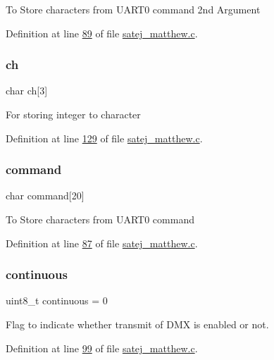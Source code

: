 To Store characters from U\+A\+R\+T0 command 2nd Argument 

Definition at line \mbox{\hyperlink{satej__matthew_8c_source_l00089}{89}} of file \mbox{\hyperlink{satej__matthew_8c_source}{satej\+\_\+matthew.\+c}}.

\mbox{\label{satej__matthew_8c_afd57a52a89b95928a54f8a6175a10486}} 
\subsubsection{\texorpdfstring{ch}{ch}}
{\footnotesize\ttfamily char ch\mbox{[}3\mbox{]}}

For storing integer to character 

Definition at line \mbox{\hyperlink{satej__matthew_8c_source_l00129}{129}} of file \mbox{\hyperlink{satej__matthew_8c_source}{satej\+\_\+matthew.\+c}}.

\mbox{\label{satej__matthew_8c_ab36a1cdf1f08575764a5aa3691b93f6f}} 
\subsubsection{\texorpdfstring{command}{command}}
{\footnotesize\ttfamily char command\mbox{[}20\mbox{]}}

To Store characters from U\+A\+R\+T0 command 

Definition at line \mbox{\hyperlink{satej__matthew_8c_source_l00087}{87}} of file \mbox{\hyperlink{satej__matthew_8c_source}{satej\+\_\+matthew.\+c}}.

\mbox{\label{satej__matthew_8c_ad9818a836c7c4d1d49d907c9fb916d83}} 
\subsubsection{\texorpdfstring{continuous}{continuous}}
{\footnotesize\ttfamily uint8\+\_\+t continuous = 0}

Flag to indicate whether transmit of D\+MX is enabled or not. 

Definition at line \mbox{\hyperlink{satej__matthew_8c_source_l00099}{99}} of file \mbox{\hyperlink{satej__matthew_8c_source}{satej\+\_\+matthew.\+c}}.

